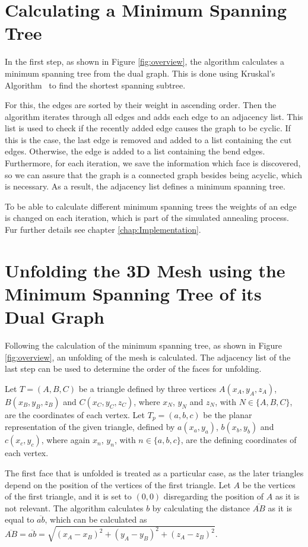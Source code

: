 \documentclass[draft,final]{vutinfth} %
\begin{document}
\section{Calculating a Minimum Spanning Tree}
\label{sec:calcmsp}
In the first step, as shown in Figure \ref{fig:overview}, the algorithm calculates a minimum spanning tree from the dual graph. This is done using Kruskal's Algorithm~\cite{kruskal1956shortest} to find the shortest spanning subtree.

For this, the edges are sorted by their weight in ascending order. Then the algorithm iterates through all edges and adds each edge to an adjacency list. This list is used to check if the recently added edge causes the graph to be cyclic. If this is the case, the last edge is removed and added to a list containing the cut edges. Otherwise, the edge is added to a list containing the bend edges. Furthermore, for each iteration, we save the information which face is discovered, so we can assure that the graph is a connected graph besides being acyclic, which is necessary. As a result, the adjacency list defines a minimum spanning tree.

To be able to calculate different minimum spanning trees the weights of an edge is changed on each iteration, which is part of the simulated annealing process. Fur further details see chapter \ref{chap:Implementation}.

\section{Unfolding the 3D Mesh using the Minimum Spanning Tree of its Dual Graph}
\label{sec:unfold}
Following the calculation of the minimum spanning tree, as shown in Figure \ref{fig:overview}, an unfolding of the mesh is calculated. The adjacency list of the last step can be used to determine the order of the faces for unfolding.

Let $T = (A,B,C)$ be a triangle defined by three vertices $A(x_A, y_A, z_A)$, $B(x_B, y_B, z_B)$ and $C(x_C, y_C, z_C)$, where $x_N$, $y_N$ and $z_N$, with $N \in \{A,B,C\}$, are the coordinates of each vertex. Let $T_p = (a, b, c)$ be the planar representation of the given triangle, defined by $a(x_a, y_a)$, $b(x_b, y_b)$ and $c(x_c, y_c)$, where again $x_n$, $y_n$, with $n \in \{a,b,c\}$, are the defining coordinates of each vertex.

The first face that is unfolded is treated as a particular case, as the later triangles depend on the position of the vertices of the first triangle. Let $A$ be the vertices of the first triangle, and it is set to $(0,0)$ disregarding the position of $A$ as it is not relevant. The algorithm calculates $b$ by calculating the distance $\overline{AB}$ as it is equal to $\overline{ab}$, which can be calculated as $\overline{AB} = \overline{ab} = \sqrt{(x_A - x_B)^2 + (y_A - y_B)^2 + (z_A - z_B)^2}$.
\end{document}
